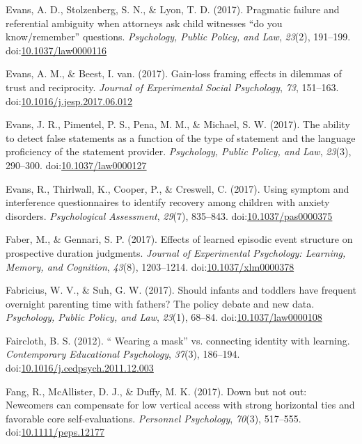 \documentclass[english,man]{apa6}
\theoremstyle{definition}
\theoremstyle{definition}
\theoremstyle{definition}
\theoremstyle{remark}
\begin{document}
\hypertarget{ref-Evans2017b}{}
Evans, A. D., Stolzenberg, S. N., \& Lyon, T. D. (2017). Pragmatic
failure and referential ambiguity when attorneys ask child witnesses
``do you know/remember'' questions. \emph{Psychology, Public Policy, and
Law}, \emph{23}(2), 191--199.
doi:\href{https://doi.org/10.1037/law0000116}{10.1037/law0000116}

\hypertarget{ref-Evans2017a}{}
Evans, A. M., \& Beest, I. van. (2017). Gain-loss framing effects in
dilemmas of trust and reciprocity. \emph{Journal of Experimental Social
Psychology}, \emph{73}, 151--163.
doi:\href{https://doi.org/10.1016/j.jesp.2017.06.012}{10.1016/j.jesp.2017.06.012}

\hypertarget{ref-Evans2017c}{}
Evans, J. R., Pimentel, P. S., Pena, M. M., \& Michael, S. W. (2017).
The ability to detect false statements as a function of the type of
statement and the language proficiency of the statement provider.
\emph{Psychology, Public Policy, and Law}, \emph{23}(3), 290--300.
doi:\href{https://doi.org/10.1037/law0000127}{10.1037/law0000127}

\hypertarget{ref-Evans2017}{}
Evans, R., Thirlwall, K., Cooper, P., \& Creswell, C. (2017). Using
symptom and interference questionnaires to identify recovery among
children with anxiety disorders. \emph{Psychological Assessment},
\emph{29}(7), 835--843.
doi:\href{https://doi.org/10.1037/pas0000375}{10.1037/pas0000375}

\hypertarget{ref-Faber2017}{}
Faber, M., \& Gennari, S. P. (2017). Effects of learned episodic event
structure on prospective duration judgments. \emph{Journal of
Experimental Psychology: Learning, Memory, and Cognition}, \emph{43}(8),
1203--1214.
doi:\href{https://doi.org/10.1037/xlm0000378}{10.1037/xlm0000378}

\hypertarget{ref-Fabricius2017}{}
Fabricius, W. V., \& Suh, G. W. (2017). Should infants and toddlers have
frequent overnight parenting time with fathers? The policy debate and
new data. \emph{Psychology, Public Policy, and Law}, \emph{23}(1),
68--84.
doi:\href{https://doi.org/10.1037/law0000108}{10.1037/law0000108}

\hypertarget{ref-Faircloth2012}{}
Faircloth, B. S. (2012). `` Wearing a mask'' vs. connecting identity
with learning. \emph{Contemporary Educational Psychology}, \emph{37}(3),
186--194.
doi:\href{https://doi.org/10.1016/j.cedpsych.2011.12.003}{10.1016/j.cedpsych.2011.12.003}

\hypertarget{ref-Fang2017}{}
Fang, R., McAllister, D. J., \& Duffy, M. K. (2017). Down but not out:
Newcomers can compensate for low vertical access with strong horizontal
ties and favorable core self-evaluations. \emph{Personnel Psychology},
\emph{70}(3), 517--555.
doi:\href{https://doi.org/10.1111/peps.12177}{10.1111/peps.12177}
\end{document}
